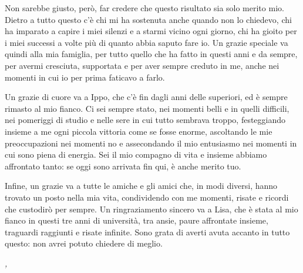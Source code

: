 Non sarebbe giusto, però, far credere che questo risultato sia solo merito mio. Dietro a tutto questo c'è chi mi ha sostenuta anche quando non lo chiedevo, chi ha imparato a 
capire i miei silenzi e a starmi vicino ogni giorno, chi ha gioito per i miei successi a volte più di quanto abbia saputo fare io. 
Un grazie speciale va quindi alla mia famiglia, per tutto quello che ha fatto in questi anni e da sempre, per avermi cresciuta, supportata e per aver sempre creduto in me, 
anche nei momenti in cui io per prima faticavo a farlo.

Un grazie di cuore va a Ippo, che c'è fin dagli anni delle superiori, ed è sempre rimasto al mio fianco. 
Ci sei sempre stato, nei momenti belli e in quelli difficili, nei pomeriggi di studio e nelle sere in cui tutto sembrava troppo, festeggiando insieme a me ogni piccola 
vittoria come se fosse enorme, ascoltando le mie preoccupazioni nei momenti no e assecondando il mio entusiasmo nei momenti in cui sono piena di energia. 
Sei il mio compagno di vita e insieme abbiamo affrontato tanto: se oggi sono arrivata fin qui, è anche merito tuo.
 
Infine, un grazie va a tutte le amiche e gli amici che, in modi diversi, hanno trovato un posto nella mia vita, condividendo con me momenti, risate e 
ricordi che custodirò per sempre. Un ringraziamento sincero va a Lisa, che è stata al mio fianco in questi tre anni di università, tra ansie, paure affrontate insieme, traguardi 
raggiunti e risate infinite. Sono grata di averti avuta accanto in tutto questo: non avrei potuto chiedere di meglio.
\endgroup

\bigskip
\noindent\textit{\myLocation, \myTime}
\hfill \myName

\cleardoublepage
\pagestyle{fancy}
